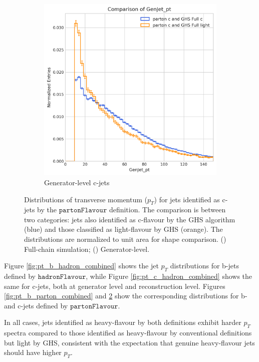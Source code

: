 \documentclass[10pt,twocolumn]{article}
\newcommand*{\parFlav}{\texttt{partonFlavour}}
\newcommand*{\hadFlav}{\texttt{hadronFlavour}}
\begin{document}
\begin{figure}[!htbp]
\begin{subfigure}[t]{0.48\textwidth}
        \includegraphics[width=\textwidth]{images/compare_GenJet_pt_GHSFull_light_vs_c_filter_partonFlavour_4.png}
        \caption{Generator-level c-jets}
        \label{fig:pt_c_parton_gen}
    \end{subfigure}
    \caption{Distributions of transverse momentum ($p_T$) for jets identified as c-jets by the $\parFlav$ definition. The comparison is between two categories: jets also identified as c-flavour by the GHS algorithm (blue) and those classified as light-flavour by GHS (orange). The distributions are normalized to unit area for shape comparison. () Full-chain simulation; () Generator-level.}
    \label{fig:pt_c_parton_combined}
\end{figure}

Figure \ref{fig:pt_b_hadron_combined} shows the jet $p_T$ distributions for b-jets defined by $\hadFlav$, while Figure \ref{fig:pt_c_hadron_combined} shows the same for c-jets, both at generator level and reconstruction level. Figures \ref{fig:pt_b_parton_combined} and \ref{fig:pt_c_parton_combined} show the corresponding distributions for b- and c-jets defined by $\parFlav$.

In all cases, jets identified as heavy-flavour by both definitions exhibit harder $p_T$ spectra compared to those identified as heavy-flavour by conventional definitions but light by GHS, consistent with the expectation that genuine heavy-flavour jets should have higher $p_T$.
\end{document}
